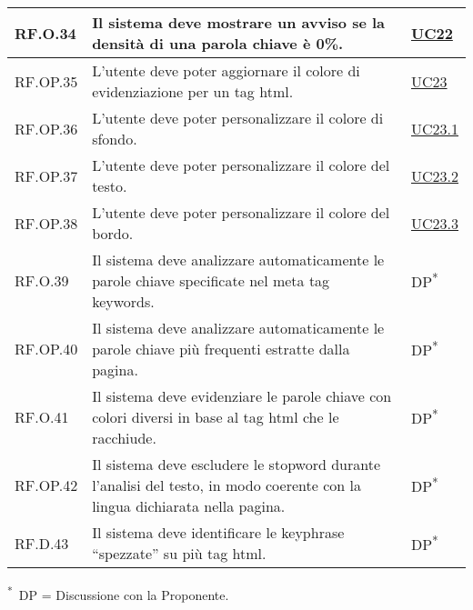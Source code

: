 \begin{tabularx}{\textwidth}{l >{\raggedright\arraybackslash}X l}
\hline
RF.O.34 & Il sistema deve mostrare un avviso se la densità di una parola chiave è 0\%. & \hyperref[UC22]{UC22} \\
\hline
RF.OP.35 & L'utente deve poter aggiornare il colore di evidenziazione per un tag \gls{html}. & \hyperref[UC23]{UC23} \\
\hline
RF.OP.36 & L'utente deve poter personalizzare il colore di sfondo. & \hyperref[UC23point1]{UC23.1} \\
\hline
RF.OP.37 & L'utente deve poter personalizzare il colore del testo. & \hyperref[UC23point2]{UC23.2} \\
\hline
RF.OP.38 & L'utente deve poter personalizzare il colore del bordo. & \hyperref[UC23point3]{UC23.3} \\
\hline
RF.O.39 & Il sistema deve analizzare automaticamente le parole chiave specificate nel meta tag keywords. & DP\textsuperscript{*} \\
\hline
RF.OP.40 & Il sistema deve analizzare automaticamente le parole chiave più frequenti estratte dalla pagina. & DP\textsuperscript{*} \\
\hline
RF.O.41 & Il sistema deve evidenziare le parole chiave con colori diversi in base al tag \gls{html} che le racchiude. & DP\textsuperscript{*} \\
\hline
RF.OP.42 & Il sistema deve escludere le \gls{stopword} durante l'analisi del testo, in modo coerente con la lingua dichiarata nella pagina. & DP\textsuperscript{*} \\
\hline
RF.D.43 & Il sistema deve identificare le keyphrase “spezzate” su più tag \gls{html}. & DP\textsuperscript{*} \\
\end{tabularx}

\vspace{3pt}
\noindent\textsuperscript{*}~DP = Discussione con la Proponente.

